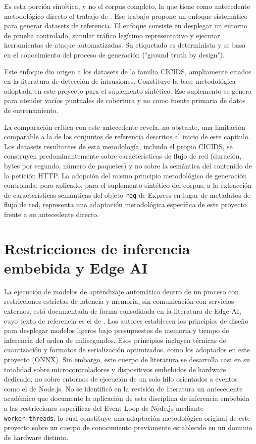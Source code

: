 Es esta porción sintética, y no el corpus completo, la que tiene como antecedente metodológico directo el trabajo de \textcite{shiravi2012}. Ese trabajo propone un enfoque sistemático para generar datasets de referencia. El enfoque consiste en desplegar un entorno de prueba controlado, simular tráfico legítimo representativo y ejecutar herramientas de ataque automatizadas. Su etiquetado es determinista y se basa en el conocimiento del proceso de generación ("ground truth by design").

Este enfoque dio origen a los datasets de la familia CICIDS, ampliamente citados en la literatura de detección de intrusiones. Constituye la base metodológica adoptada en este proyecto para el suplemento sintético. Ese suplemento se genera para atender vacíos puntuales de cobertura y no como fuente primaria de datos de entrenamiento.

La comparación crítica con este antecedente revela, no obstante, una limitación comparable a la de los conjuntos de referencia descritos al inicio de este capítulo. Los datasets resultantes de esta metodología, incluido el propio CICIDS, se construyen predominantemente sobre características de flujo de red (duración, bytes por segundo, número de paquetes) y no sobre la semántica del contenido de la petición HTTP. La adopción del mismo principio metodológico de generación controlada, pero aplicado, para el suplemento sintético del corpus, a la extracción de características semánticas del objeto \texttt{req} de Express en lugar de metadatos de flujo de red, representa una adaptación metodológica específica de este proyecto frente a su antecedente directo.

\section{Restricciones de inferencia embebida y Edge AI}

La ejecución de modelos de aprendizaje automático dentro de un proceso con restricciones estrictas de latencia y memoria, sin comunicación con servicios externos, está documentada de forma consolidada en la literatura de Edge AI, cuyo texto de referencia es el de \textcite{warden2019}. Los autores establecen los principios de diseño para desplegar modelos ligeros bajo presupuestos de memoria y tiempo de inferencia del orden de milisegundos. Esos principios incluyen técnicas de cuantización y formatos de serialización optimizados, como los adoptados en este proyecto (ONNX). Sin embargo, este cuerpo de literatura se desarrolla casi en su totalidad sobre microcontroladores y dispositivos embebidos de hardware dedicado, no sobre entornos de ejecución de un solo hilo orientados a eventos como el de Node.js. No se identificó en la revisión de literatura un antecedente académico que documente la aplicación de esta disciplina de inferencia embebida a las restricciones específicas del Event Loop de Node.js mediante \texttt{worker\_threads}, lo cual constituye una adaptación metodológica original de este proyecto sobre un cuerpo de conocimiento previamente establecido en un dominio de hardware distinto.


